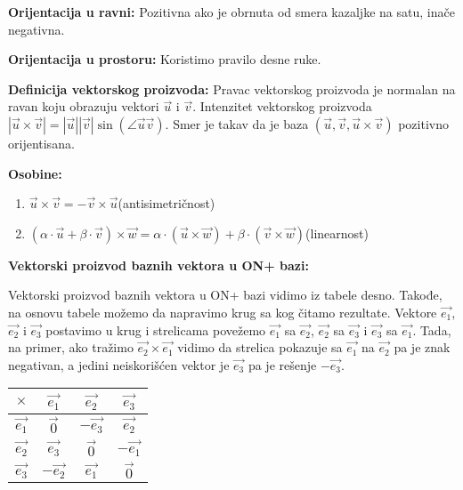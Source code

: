 \documentclass[12pt]{article}
\newcommand{\vek}[1]{\overrightarrow{#1}}
\begin{document}
\textbf{Orijentacija u ravni:} Pozitivna ako je obrnuta od smera kazaljke na
satu, inače negativna.
\par

\textbf{Orijentacija u prostoru:} Koristimo pravilo desne ruke.
\par

\textbf{Definicija vektorskog proizvoda:} Pravac vektorskog proizvoda je
normalan na ravan koju obrazuju vektori $\vek{u}$ i $\vek{v}$. Intenzitet
vektorskog proizvoda $|\vek{u}\times\vek{v}|=|\vek{u}||\vek{v}|
    \sin(\angle\vek{u}\vek{v})$. Smer je takav da je baza
$(\vek{u},\vek{v},\vek{u}\times\vek{v})$ pozitivno orijentisana.
\par

\textbf{Osobine:}
\begin{enumerate}[label=\textit{\arabic*)}]
    \item $\vek{u}\times\vek{v}=-\vek{v}\times\vek{u}$\hspace*{1cm}(antisimetričnost)
    \item $(\alpha\cdot\vek{u}+\beta\cdot\vek{v})\times\vek{w}=\alpha\cdot(\vek{u}\times\vek{w})+\beta\cdot(\vek{v}\times\vek{w})$\hspace*{1cm}(linearnost)
\end{enumerate}
\par

\textbf{Vektorski proizvod baznih vektora u ON+ bazi:}\\[0.1cm]
\noindent
\begin{minipage}{0.65\textwidth}
    \begin{flushleft}
        Vektorski proizvod baznih vektora u ON+ bazi vidimo iz tabele desno.
        Takođe, na osnovu tabele možemo da napravimo krug sa kog čitamo
        rezultate. Vektore $\vek{e_1}$, $\vek{e_2}$ i $\vek{e_3}$ postavimo u
        krug i strelicama povežemo $\vek{e_1}$ sa $\vek{e_2}$, $\vek{e_2}$ sa
        $\vek{e_3}$ i $\vek{e_3}$ sa $\vek{e_1}$. Tada, na primer, ako tražimo
        $\vek{e_2}\times\vek{e_1}$ vidimo da strelica pokazuje sa $\vek{e_1}$
        na $\vek{e_2}$ pa je znak negativan, a jedini neiskorišćen vektor je
        $\vek{e_3}$ pa je rešenje $-\vek{e_3}$.
    \end{flushleft}
\end{minipage}
\hfill
\begin{minipage}{0.3\textwidth}
    \centering
    \begin{tabular}{|c|c|c|c|}
        \hline
        $\times$    & $\vek{e_1}$  & $\vek{e_2}$  & $\vek{e_3}$  \\
        \hline
        $\vek{e_1}$ & $\vek{0}$    & $-\vek{e_3}$ & $\vek{e_2}$  \\
        \hline
        $\vek{e_2}$ & $\vek{e_3}$  & $\vek{0}$    & $-\vek{e_1}$ \\
        \hline
        $\vek{e_3}$ & $-\vek{e_2}$ & $\vek{e_1}$  & $\vek{0}$    \\
        \hline
    \end{tabular}
\end{minipage}
\par
\end{document}

